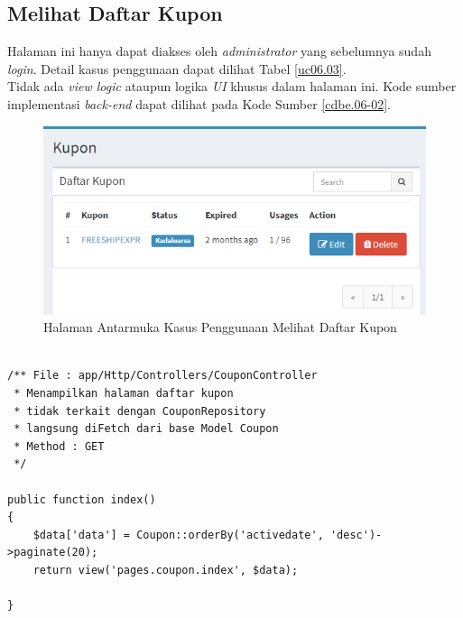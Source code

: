

\subsection{Melihat Daftar Kupon}
Halaman ini hanya dapat diakses oleh \textit{administrator} yang sebelumnya sudah \textit{login}. Detail kasus penggunaan dapat dilihat Tabel \ref{uc06.03}.\\
\indent Tidak ada \textit{view logic} ataupun logika \textit{UI} khusus dalam halaman ini. Kode sumber implementasi \textit{back-end} dapat dilihat pada Kode Sumber \ref{cdbe.06-02}.

  \begin{figure}[H]
  	\centering
  	\includegraphics[width=\textwidth]{images/bab4/ui/06-02.png}
  	\caption{Halaman Antarmuka Kasus Penggunaan Melihat Daftar Kupon}
  	\label{ui.06-02}
  \end{figure}
\begin{lstlisting}[label=cdbe.06-02,style=php,caption=Implementasi Antarmuka Melihat Daftar Kupon]

/** File : app/Http/Controllers/CouponController
 * Menampilkan halaman daftar kupon
 * tidak terkait dengan CouponRepository
 * langsung diFetch dari base Model Coupon
 * Method : GET
 */

public function index()
{
    $data['data'] = Coupon::orderBy('activedate', 'desc')->paginate(20);
    return view('pages.coupon.index', $data);

}
\end{lstlisting}
      

      
